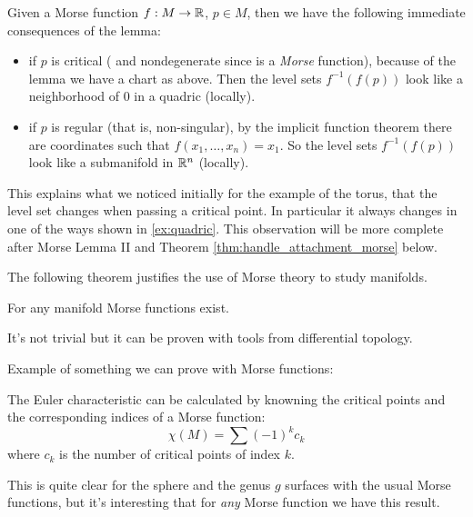 
\noindent Given a Morse function $f: M \to \mathbb{R}$, $p \in M$, then we have the following immediate consequences of the lemma:
\begin{itemize}
    \item if $p$ is critical ( and nondegenerate since is a \textit{Morse} function), because of the lemma we have a chart as above. Then the level sets $f^{-1} (f(p))$ look like a neighborhood of 0 in a quadric (locally).
    \item if $p$ is regular (that is, non-singular), by the implicit function theorem there are coordinates such that $f(x_1, \dots, x_n) = x_1$. So the level sets $f^{-1} (f(p))$ look like a submanifold in $\mathbb{R}^n$ (locally).
\end{itemize}
This explains what we noticed initially for the example of the torus, that the level set changes when passing a critical point. In particular it always changes in one of the ways shown in \ref{ex:quadric}. This observation will be more complete after Morse Lemma II and Theorem \ref{thm:handle_attachment_morse} below.

The following theorem justifies the use of Morse theory to study manifolds.
\begin{thm}
    For any manifold Morse functions exist.
    \label{thm:morse_exist}
\end{thm}
\noindent It's not trivial but it can be proven with tools from differential topology.

Example of something we can prove with Morse functions:
\begin{thm}
    The Euler characteristic can be calculated by knowning the critical points and the corresponding indices of a Morse function:
    \begin{equation}
        \chi(M) = \sum (-1)^k c_k
    \end{equation}
    where $c_k$ is the number of critical points of index $k$.
\end{thm}
\noindent This is quite clear for the sphere and the genus $g$ surfaces with the usual Morse functions, but it's interesting that for \textit{any} Morse function we have this result.

